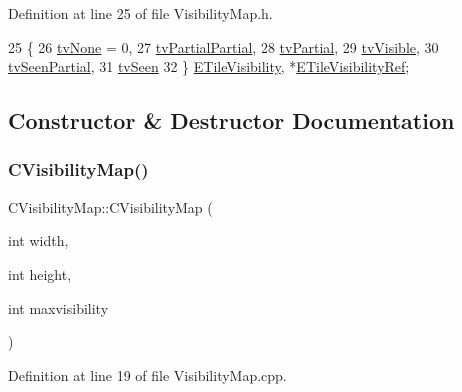 Definition at line 25 of file Visibility\+Map.\+h.


\begin{DoxyCode}
25                     \{
26             \hyperlink{classCVisibilityMap_a6665f905da08825adbb0eee7bd1f2f30aec106086bdc6328c8c6c02ee1bf32d2c}{tvNone} = 0,
27             \hyperlink{classCVisibilityMap_a6665f905da08825adbb0eee7bd1f2f30a75af969b6d667b802b64bacd8bca7b63}{tvPartialPartial},
28             \hyperlink{classCVisibilityMap_a6665f905da08825adbb0eee7bd1f2f30a0037f47075e3bde5e8e32dbd55754976}{tvPartial},
29             \hyperlink{classCVisibilityMap_a6665f905da08825adbb0eee7bd1f2f30a3c881652ef7164aa086e595eef0ff5d6}{tvVisible},
30             \hyperlink{classCVisibilityMap_a6665f905da08825adbb0eee7bd1f2f30a7f9292f5d7ed9e9497f8ef342c890466}{tvSeenPartial},
31             \hyperlink{classCVisibilityMap_a6665f905da08825adbb0eee7bd1f2f30ab7c30a117286ac3a8891862f6c1bb5c6}{tvSeen}
32         \} \hyperlink{classCVisibilityMap_a6665f905da08825adbb0eee7bd1f2f30}{ETileVisibility}, *\hyperlink{classCVisibilityMap_a6cf5b0323092b90b86a6d3d8778b4fb1}{ETileVisibilityRef};
\end{DoxyCode}


\subsection{Constructor \& Destructor Documentation}
\hypertarget{classCVisibilityMap_aa5f898269a92cc63487ccca7d4c4de04}{}\label{classCVisibilityMap_aa5f898269a92cc63487ccca7d4c4de04} 
\subsubsection{\texorpdfstring{C\+Visibility\+Map()}{CVisibilityMap()}\hspace{0.1cm}{\footnotesize\ttfamily [1/2]}}
{\footnotesize\ttfamily C\+Visibility\+Map\+::\+C\+Visibility\+Map (\begin{DoxyParamCaption}\item[{int}]{width,  }\item[{int}]{height,  }\item[{int}]{maxvisibility }\end{DoxyParamCaption})}



Definition at line 19 of file Visibility\+Map.\+cpp.



